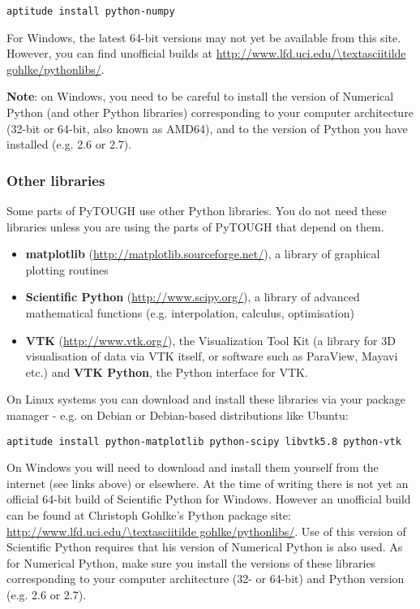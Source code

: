 \texttt{aptitude install python-numpy}

For Windows, the latest 64-bit versions may not yet be available from this site.  However, you can find unofficial builds at \url{http://www.lfd.uci.edu/\textasciitilde gohlke/pythonlibs/}.

\textbf{Note}: on Windows, you need to be careful to install the version of Numerical Python (and other Python libraries) corresponding to your computer architecture (32-bit or 64-bit, also known as AMD64), and to the version of Python you have installed (e.g. 2.6 or 2.7).

\subsubsection{Other libraries}


Some parts of PyTOUGH use other Python libraries.  You do not need these libraries unless you are using the parts of PyTOUGH that depend on them.

\begin{itemize}
\item \textbf{matplotlib} (\url{http://matplotlib.sourceforge.net/}), a library of graphical plotting routines
\item \textbf{Scientific Python} (\url{http://www.scipy.org/}), a library of advanced mathematical functions (e.g. interpolation, calculus, optimisation)
\item \textbf{VTK} (\url{http://www.vtk.org/}), the Visualization Tool Kit (a library for 3D visualisation of data via VTK itself, or software such as ParaView, Mayavi etc.) and \textbf{VTK Python}, the Python interface for VTK.
\end{itemize}

On Linux systems you can download and install these libraries via your package manager - e.g. on Debian or Debian-based distributions like Ubuntu:

\texttt{aptitude install python-matplotlib python-scipy libvtk5.8 python-vtk}

On Windows you will need to download and install them yourself from the internet (see links above) or elsewhere.  At the time of writing there is not yet an official 64-bit build of Scientific Python for Windows.  However an unofficial build can be found at Christoph Gohlke's Python package site: \url{http://www.lfd.uci.edu/\textasciitilde gohlke/pythonlibs/}.  Use of this version of Scientific Python requires that his version of Numerical Python is also used.  As for Numerical Python, make sure you install the versions of these libraries corresponding to your computer architecture (32- or 64-bit) and Python version (e.g. 2.6 or 2.7).

